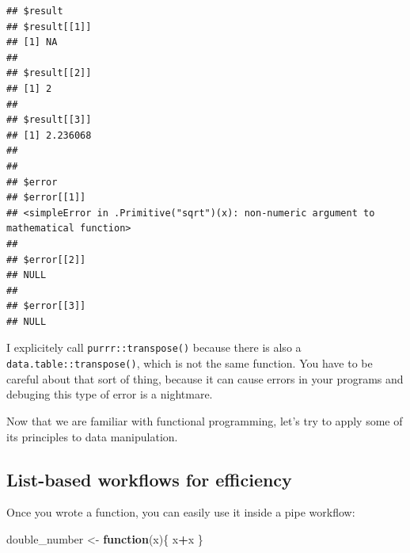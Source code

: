 \documentclass[]{gitbook}
\newenvironment{Shaded}{\begin{snugshade}}{\end{snugshade}}
\newcommand{\ControlFlowTok}[1]{\textcolor[rgb]{0.13,0.29,0.53}{\textbf{#1}}}
\newcommand{\DataTypeTok}[1]{\textcolor[rgb]{0.13,0.29,0.53}{#1}}
\newcommand{\KeywordTok}[1]{\textcolor[rgb]{0.13,0.29,0.53}{\textbf{#1}}}
\newcommand{\NormalTok}[1]{#1}
\newcommand{\OperatorTok}[1]{\textcolor[rgb]{0.81,0.36,0.00}{\textbf{#1}}}
\newcommand{\StringTok}[1]{\textcolor[rgb]{0.31,0.60,0.02}{#1}}
\begin{document}
\begin{verbatim}
## $result
## $result[[1]]
## [1] NA
## 
## $result[[2]]
## [1] 2
## 
## $result[[3]]
## [1] 2.236068
## 
## 
## $error
## $error[[1]]
## <simpleError in .Primitive("sqrt")(x): non-numeric argument to mathematical function>
## 
## $error[[2]]
## NULL
## 
## $error[[3]]
## NULL
\end{verbatim}

I explicitely call \texttt{purrr::transpose()} because there is also a \texttt{data.table::transpose()}, which
is not the same function. You have to be careful about that sort of thing, because it can cause
errors in your programs and debuging this type of error is a nightmare.

Now that we are familiar with functional programming, let's try to apply some of its principles
to data manipulation.

\hypertarget{list-based-workflows-for-efficiency}{%
\subsection{List-based workflows for efficiency}\label{list-based-workflows-for-efficiency}}

Once you wrote a function, you can easily use it inside a pipe workflow:

\begin{Shaded}
\begin{Highlighting}[]
\NormalTok{double_number <-}\StringTok{ }\ControlFlowTok{function}\NormalTok{(x)\{}
\NormalTok{  x}\OperatorTok{+}\NormalTok{x}
\NormalTok{\}}
\end{Highlighting}
\end{Shaded}

\begin{Shaded}
\end{Shaded}
\end{document}
